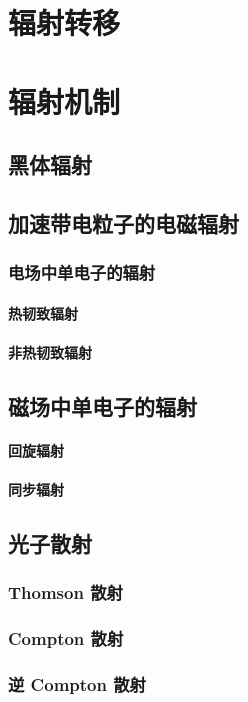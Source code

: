 \section{辐射转移}

\section{辐射机制}

\subsection{黑体辐射}

\subsection{加速带电粒子的电磁辐射}

\subsubsection{电场中单电子的辐射}

\paragraph{热韧致辐射}

\paragraph{非热韧致辐射}

\subsection{磁场中单电子的辐射}

\paragraph{回旋辐射}

\paragraph{同步辐射}

\subsection{光子散射}

\subsubsection{Thomson 散射}

\subsubsection{Compton 散射}

\subsubsection{逆 Compton 散射}
